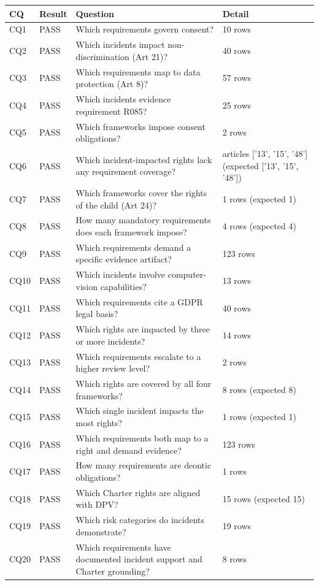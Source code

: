 \begin{tabular}{llp{7cm}l}
\toprule
\textbf{CQ} & \textbf{Result} & \textbf{Question} & \textbf{Detail} \\
\midrule
CQ1 & PASS & Which requirements govern consent? & 10 rows \\
CQ2 & PASS & Which incidents impact non-discrimination (Art 21)? & 40 rows \\
CQ3 & PASS & Which requirements map to data protection (Art 8)? & 57 rows \\
CQ4 & PASS & Which incidents evidence requirement R085? & 25 rows \\
CQ5 & PASS & Which frameworks impose consent obligations? & 2 rows \\
CQ6 & PASS & Which incident-impacted rights lack any requirement coverage? & articles ['13', '15', '48'] (expected ['13', '15', '48']) \\
CQ7 & PASS & Which frameworks cover the rights of the child (Art 24)? & 1 rows (expected 1) \\
CQ8 & PASS & How many mandatory requirements does each framework impose? & 4 rows (expected 4) \\
CQ9 & PASS & Which requirements demand a specific evidence artifact? & 123 rows \\
CQ10 & PASS & Which incidents involve computer-vision capabilities? & 13 rows \\
CQ11 & PASS & Which requirements cite a GDPR legal basis? & 40 rows \\
CQ12 & PASS & Which rights are impacted by three or more incidents? & 14 rows \\
CQ13 & PASS & Which requirements escalate to a higher review level? & 2 rows \\
CQ14 & PASS & Which rights are covered by all four frameworks? & 8 rows (expected 8) \\
CQ15 & PASS & Which single incident impacts the most rights? & 1 rows (expected 1) \\
CQ16 & PASS & Which requirements both map to a right and demand evidence? & 123 rows \\
CQ17 & PASS & How many requirements are deontic obligations? & 1 rows \\
CQ18 & PASS & Which Charter rights are aligned with DPV? & 15 rows (expected 15) \\
CQ19 & PASS & Which risk categories do incidents demonstrate? & 19 rows \\
CQ20 & PASS & Which requirements have documented incident support and Charter grounding? & 8 rows \\
\bottomrule
\end{tabular}
